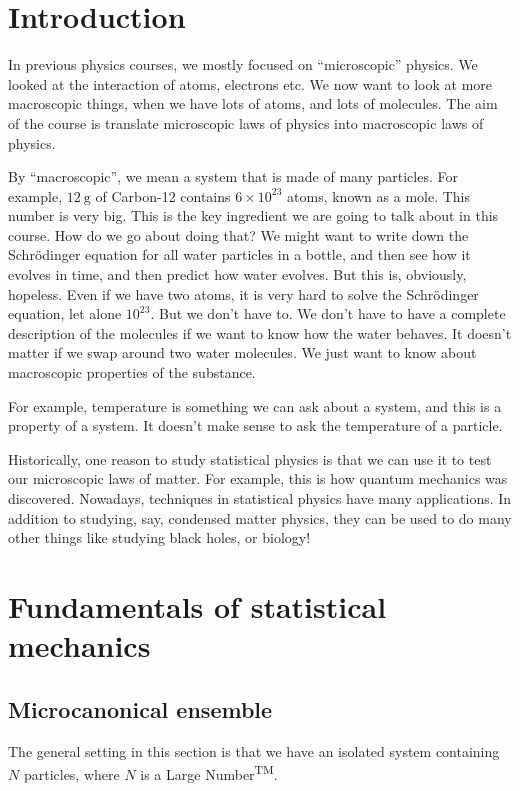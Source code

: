 \documentclass[a4paper]{article}
\begin{document}
\section{Introduction}
In previous physics courses, we mostly focused on ``microscopic'' physics. We looked at the interaction of atoms, electrons etc. We now want to look at more macroscopic things, when we have lots of atoms, and lots of molecules. The aim of the course is translate microscopic laws of physics into macroscopic laws of physics.

By ``macroscopic'', we mean a system that is made of many particles. For example, $\SI{12}{\gram}$ of Carbon-12 contains $6 \times 10^{23}$ atoms, known as a mole. This number is very big. This is the key ingredient we are going to talk about in this course. How do we go about doing that? We might want to write down the Schr\"odinger equation for all water particles in a bottle, and then see how it evolves in time, and then predict how water evolves. But this is, obviously, hopeless. Even if we have two atoms, it is very hard to solve the Schr\"odinger equation, let alone $10^{23}$. But we don't have to. We don't have to have a complete description of the molecules if we want to know how the water behaves. It doesn't matter if we swap around two water molecules. We just want to know about macroscopic properties of the substance.

For example, temperature is something we can ask about a system, and this is a property of a system. It doesn't make sense to ask the temperature of a particle.

Historically, one reason to study statistical physics is that we can use it to test our microscopic laws of matter. For example, this is how quantum mechanics was discovered. Nowadays, techniques in statistical physics have many applications. In addition to studying, say, condensed matter physics, they can be used to do many other things like studying black holes, or biology!

\section{Fundamentals of statistical mechanics}
\subsection{Microcanonical ensemble}
The general setting in this section is that we have an isolated system containing $N$ particles, where $N$ is a Large Number\textsuperscript{TM}.
\end{document}
